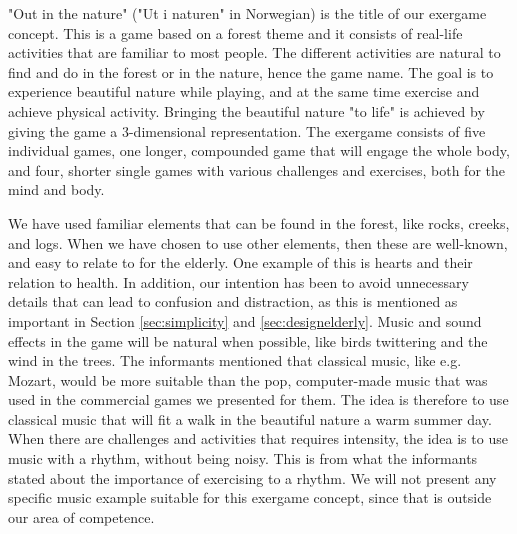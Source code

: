 "Out in the nature" ("Ut i naturen" in Norwegian) is the title of our exergame concept. This is a game based on a forest theme and it consists of real-life activities that are familiar to most people. The different activities are natural to find and do in the forest or in the nature, hence the game name. The goal is to experience beautiful nature while playing, and at the same time exercise and achieve physical activity. Bringing the beautiful nature "to life" is achieved by giving the game a 3-dimensional representation. The exergame consists of five individual games, one longer, compounded game that will engage the whole body, and four, shorter single games with various challenges and exercises, both for the mind and body.        

We have used familiar elements that can be found in the forest, like rocks, creeks, and logs. When we have chosen to use other elements, then these are well-known, and easy to relate to for the elderly. One example of this is hearts and their relation to health. In addition, our intention has been to avoid unnecessary details that can lead to confusion and distraction, as this is mentioned as important in Section \ref{sec:simplicity} and \ref{sec:designelderly}. Music and sound effects in the game will be natural when possible, like birds twittering and the wind in the trees. The informants mentioned that classical music, like e.g. Mozart, would be more suitable than the pop, computer-made music that was used in the commercial games we presented for them. The idea is therefore to use classical music that will fit a walk in the beautiful nature a warm summer day. When there are challenges and activities that requires intensity, the idea is to use music with a rhythm, without being noisy. This is from what the informants stated about the importance of exercising to a rhythm. We will not present any specific music example suitable for this exergame concept, since that is outside our area of competence. 

